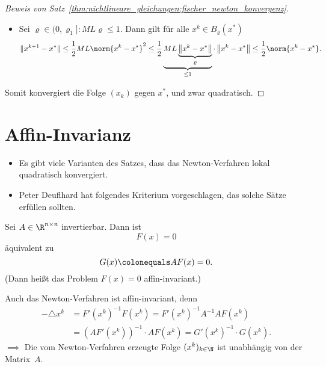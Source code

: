 \begin{proof}[Beweis von Satz~\ref{thm:nichtlineare_gleichungen:fischer_newton_konvergenz}]
\begin{itemize}
  \item Sei $\varrho \in (0,\varrho_1] \colon ML \varrho \leq 1$. Dann gilt für alle $x^k \in B_{\varrho}(x^*)$
   \begin{equation*}
    \Vert x^{k+1}-x^* \Vert
    \leq
    \frac{1}{2}ML \norm{x^k-x^*}^2
    \leq
    \frac{1}{2} \underbrace{ML \underbrace{\left\Vert x^k-x^* \right\Vert}_{\varrho}}_{\leq 1} \cdot \left\Vert x^k-x^* \right\Vert \leq \frac{1}{2} \norm{x^k-x^*}.
   \end{equation*}
\end{itemize}
Somit konvergiert die Folge $(x_k)$ gegen $x^*$, und zwar quadratisch.
\end{proof}


\section{Affin-Invarianz}

\begin{itemize}
 \item Es gibt viele Varianten des Satzes, dass das Newton-Verfahren lokal quadratisch konvergiert.

 \item Peter Deuflhard hat folgendes Kriterium vorgeschlagen, das solche Sätze erfüllen sollten.
\end{itemize}

Sei $A \in \R^{n \times n}$ invertierbar. Dann ist
\begin{equation*}
 F(x)=0
\end{equation*}
äquivalent zu
\begin{equation*}
 G(x)\colonequals AF(x)=0.
\end{equation*}
(Dann heißt das Problem $F(x)=0$ affin-invariant.)

\bigskip

Auch das Newton-Verfahren ist affin-invariant, denn
\begin{align*}
- \triangle x^k
 & =
 F' (x^k)^{-1} F(x^k)
 =
 F'(x^k)^{-1}A^{-1}AF(x^k) \\
 & =
 (AF'(x^k))^{-1} \cdot AF(x^k)
 =
 G'(x^k)^{-1} \cdot G(x^k).
\end{align*}
$\implies$ Die vom Newton-Verfahren erzeugte Folge $(x^k)_{k \in \N}$ ist unabhängig von der Matrix~$A$.

\bigskip

